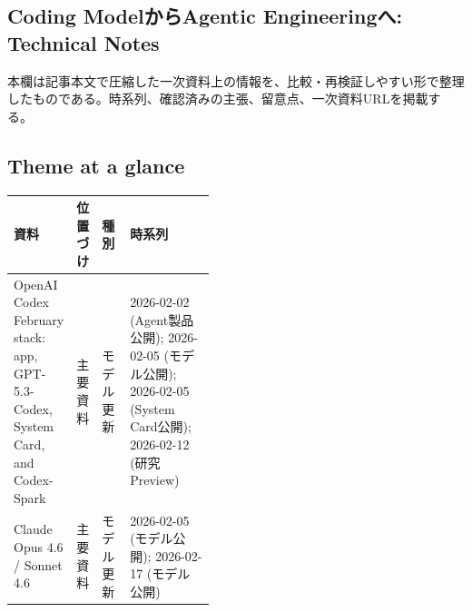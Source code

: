 \subsection*{Coding ModelからAgentic Engineeringへ: Technical Notes}
本欄は記事本文で圧縮した一次資料上の情報を、比較・再検証しやすい形で整理したものである。時系列、確認済みの主張、留意点、一次資料URLを掲載する。
\medskip
\subsection*{Theme at a glance}
\begin{center}
\footnotesize
\begin{tabularx}{\linewidth}{@{}p{0.20\linewidth}p{0.10\linewidth}p{0.14\linewidth}X@{}}
\toprule
資料 & 位置づけ & 種別 & 時系列 \\
\midrule
OpenAI Codex February stack: app, GPT-5.3-Codex, System Card, and Codex-Spark & 主要資料 & モデル更新 & 2026-02-02 (Agent製品公開); 2026-02-05 (モデル公開); 2026-02-05 (System Card公開); 2026-02-12 (研究Preview) \\
Claude Opus 4.6 / Sonnet 4.6 & 主要資料 & モデル更新 & 2026-02-05 (モデル公開); 2026-02-17 (モデル公開) \\
\bottomrule
\end{tabularx}
\end{center}
\normalsize


